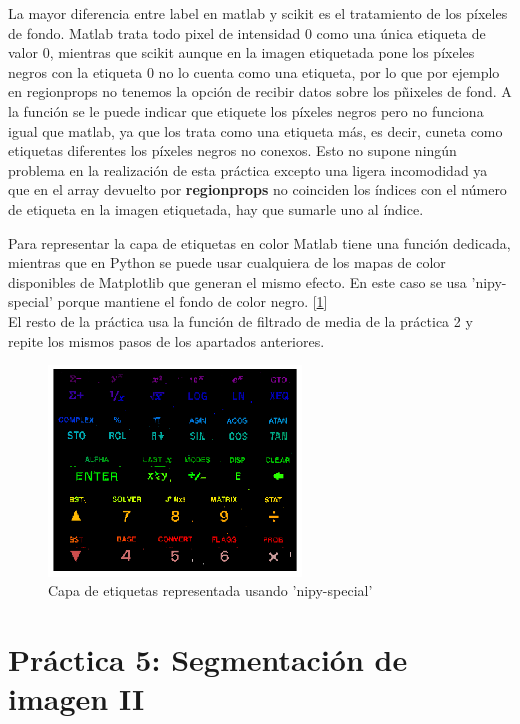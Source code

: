 \documentclass[a4paper,12pt]{report}
\begin{document}
La mayor diferencia entre label en matlab y scikit es el tratamiento de los píxeles de fondo. Matlab trata todo pixel de intensidad 0 como una única etiqueta de valor 0, mientras que scikit aunque en la imagen etiquetada pone los píxeles negros con la etiqueta 0 no lo cuenta como una etiqueta, por lo que por ejemplo en regionprops no tenemos la opción de recibir datos sobre los pñixeles de fond. A la función se le puede indicar que etiquete los píxeles negros pero no funciona igual que matlab, ya que los trata como una etiqueta más, es decir, cuneta como etiquetas diferentes los píxeles negros no conexos. Esto no supone ningún problema en la realización de esta práctica excepto una ligera incomodidad ya que en el array devuelto por \textbf{regionprops} no coinciden los índices con el número de etiqueta en la imagen etiquetada, hay que sumarle uno al índice.

Para representar la capa de etiquetas en color Matlab tiene una función dedicada, mientras que en Python se puede usar cualquiera de los mapas de color disponibles de Matplotlib que generan el mismo efecto. En este caso se usa 'nipy-special' porque mantiene el fondo de color negro. [\ref{color}]\\

El resto de la práctica usa la función de filtrado de media de la práctica 2 y repite los mismos pasos de los apartados anteriores.

\begin{figure}[h]
\centering
\includegraphics[width=0.6\textwidth]{imagenes/color}
\caption{Capa de etiquetas representada usando 'nipy-special'}
\label{color}
\end{figure}


\section{ Práctica 5: Segmentación de imagen II}
\end{document}
